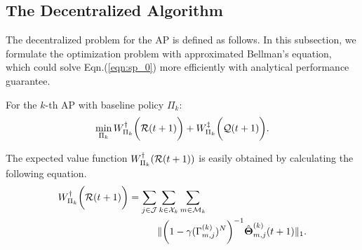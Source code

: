 \subsection{The Decentralized Algorithm}
The decentralized problem for the AP is defined as follows.
In this subsection, we formulate the optimization problem with approximated Bellman's equation, which could solve Eqn.(\ref{eqn:sp_0}) more efficiently with analytical performance guarantee.
\begin{problem}
    For the $k$-th AP with baseline policy $\Pi_{k}$:
    \begin{align}
        \min_{\Pi_{k}} W^{\dagger}_{\Pi_{k}}\bigg(\mathcal{R}(t+1)\bigg) + W^{\ddagger}_{\Pi_{k}}\bigg(\mathcal{Q}(t+1)\bigg).
        \label{eqn:partial}
    \end{align}
\end{problem}

The expected value function $W^{\dagger}_{\Pi_{k}}(\mathcal{R}(t+1))$ is easily obtained by calculating the following equation.
\begin{align}
    W^{\dagger}_{\Pi_{k}}\bigg(\mathcal{R}(t+1)\bigg) = \sum_{j\in\mathcal{J}}&\sum_{k\in\mathcal{X}_{k}}\sum_{m\in\mathcal{M}_{k}}
    \nonumber\\
    &\lVert
        \bigg( 1 - \gamma ({\Gamma}^{(k)}_{m,j})^{N} \bigg)^{-1} \hat{\boldsymbol{\Theta}}^{(k)}_{m,j}(t+1)
    \|_1.
    \label{w_ap}
\end{align}

